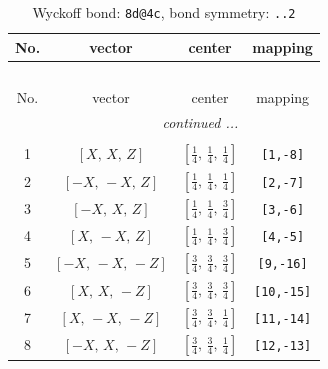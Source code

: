 \documentclass[fleqn,8pt]{jsarticle}
\begin{document}
\begin{longtable}{cccc}
\caption{Wyckoff bond: {\tt 8d@4c}, bond symmetry: {\tt ..2}}
 \\
 \hline \hline
No. & vector & center & mapping \\ \hline \endfirsthead

\multicolumn{3}{l}{\tablename\ \thetable{}} \\
 \hline \hline
No. & vector & center & mapping \\ \hline \endhead

 \hline \hline
\multicolumn{3}{r}{\footnotesize\it continued ...} \\ \endfoot

 \hline \hline
\multicolumn{3}{r}{} \\ \endlastfoot

1 & $\left[ X,\, X,\, Z \right]$ & $\left[ \frac{1}{4},\, \frac{1}{4},\, \frac{1}{4} \right]$ & {\tt [1,-8]} \\ \hline
2 & $\left[ - X,\, - X,\, Z \right]$ & $\left[ \frac{1}{4},\, \frac{1}{4},\, \frac{1}{4} \right]$ & {\tt [2,-7]} \\ \hline
3 & $\left[ - X,\, X,\, Z \right]$ & $\left[ \frac{1}{4},\, \frac{1}{4},\, \frac{3}{4} \right]$ & {\tt [3,-6]} \\ \hline
4 & $\left[ X,\, - X,\, Z \right]$ & $\left[ \frac{1}{4},\, \frac{1}{4},\, \frac{3}{4} \right]$ & {\tt [4,-5]} \\ \hline
5 & $\left[ - X,\, - X,\, - Z \right]$ & $\left[ \frac{3}{4},\, \frac{3}{4},\, \frac{3}{4} \right]$ & {\tt [9,-16]} \\ \hline
6 & $\left[ X,\, X,\, - Z \right]$ & $\left[ \frac{3}{4},\, \frac{3}{4},\, \frac{3}{4} \right]$ & {\tt [10,-15]} \\ \hline
7 & $\left[ X,\, - X,\, - Z \right]$ & $\left[ \frac{3}{4},\, \frac{3}{4},\, \frac{1}{4} \right]$ & {\tt [11,-14]} \\ \hline
8 & $\left[ - X,\, X,\, - Z \right]$ & $\left[ \frac{3}{4},\, \frac{3}{4},\, \frac{1}{4} \right]$ & {\tt [12,-13]} \\
\end{longtable}
\renewcommand{\arraystretch}{1.2}
\end{document}
